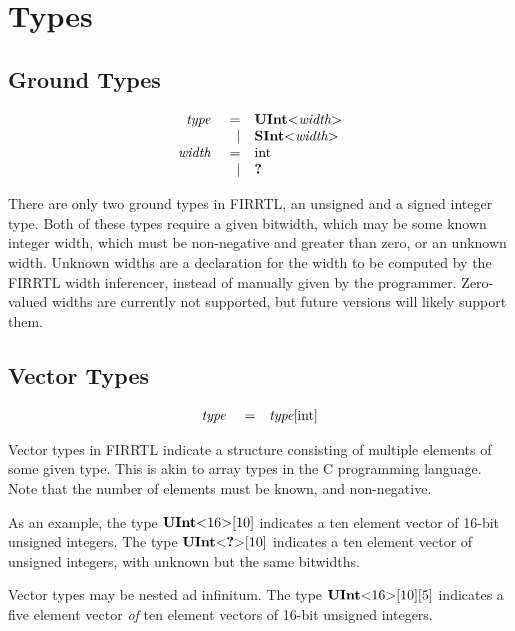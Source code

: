 \documentclass[12pt]{article}
\begin{document}
\section{Types}

\subsection{Ground Types}
\[
\begin{array}{rrl}
\text{\em type\ }       &=     &\text{\bf UInt}\text{\bf $<$} \text{\em width} \text{\bf $>$}      \\
                &\vert &\text{\bf SInt}\text{\bf $<$} \text{\em width} \text{\bf $>$}      \\
\text{\em width\ }      &=     &\text{int}                       \\
                &\vert &\text{\bf ?\ }                      \\
\end{array}
\]

There are only two ground types in FIRRTL, an unsigned and a signed integer type.
Both of these types require a given bitwidth, which may be some known integer width, which must be non-negative and greater than zero, or an unknown width.
Unknown widths are a declaration for the width to be computed by the FIRRTL width inferencer, instead of manually given by the programmer.
Zero-valued widths are currently not supported, but future versions will likely support them.

\subsection{Vector Types}
\[
\begin{array}{rrl}
\text{\em type\ }       &=     &\text{\em type}[\text{int}]           \\
\end{array}
\]

Vector types in FIRRTL indicate a structure consisting of multiple elements of some given type.
This is akin to array types in the C programming language.
Note that the number of elements must be known, and non-negative.

As an example, the type $\text{\bf UInt}\text{\bf $<$} 16 \text{\bf $>$}[10]$ indicates a ten element vector of 16-bit unsigned integers.
The type $\text{\bf UInt}\text{\bf $<$} \text{\bf ?} \text{\bf $>$}[10]$ indicates a ten element vector of unsigned integers, with unknown but the same bitwidths.

Vector types may be nested ad infinitum.
The type $\text{\bf UInt}\text{\bf $<$} 16 \text{\bf $>$}[10][5]$ indicates a five element vector {\em of} ten element vectors of 16-bit unsigned integers.
\end{document}
